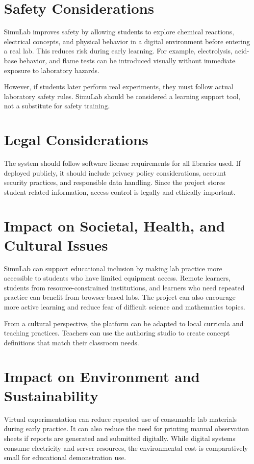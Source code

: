 \documentclass[12pt,a4paper]{report}
\begin{document}
\section{Safety Considerations}
SimuLab improves safety by allowing students to explore chemical reactions, electrical concepts, and physical behavior in a digital environment before entering a real lab. This reduces risk during early learning. For example, electrolysis, acid-base behavior, and flame tests can be introduced visually without immediate exposure to laboratory hazards.

However, if students later perform real experiments, they must follow actual laboratory safety rules. SimuLab should be considered a learning support tool, not a substitute for safety training.

\section{Legal Considerations}
The system should follow software license requirements for all libraries used. If deployed publicly, it should include privacy policy considerations, account security practices, and responsible data handling. Since the project stores student-related information, access control is legally and ethically important.

\section{Impact on Societal, Health, and Cultural Issues}
SimuLab can support educational inclusion by making lab practice more accessible to students who have limited equipment access. Remote learners, students from resource-constrained institutions, and learners who need repeated practice can benefit from browser-based labs. The project can also encourage more active learning and reduce fear of difficult science and mathematics topics.

From a cultural perspective, the platform can be adapted to local curricula and teaching practices. Teachers can use the authoring studio to create concept definitions that match their classroom needs.

\section{Impact on Environment and Sustainability}
Virtual experimentation can reduce repeated use of consumable lab materials during early practice. It can also reduce the need for printing manual observation sheets if reports are generated and submitted digitally. While digital systems consume electricity and server resources, the environmental cost is comparatively small for educational demonstration use.
\end{document}
